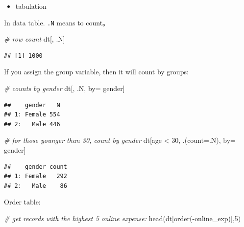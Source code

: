 \documentclass[
  12pt,
]{krantz}
\makeatletter
\newenvironment{Shaded}{\begin{snugshade}}{\end{snugshade}}
\newcommand{\AttributeTok}[1]{\textcolor[rgb]{0.61,0.61,0.61}{#1}}
\newcommand{\CommentTok}[1]{\textcolor[rgb]{0.37,0.37,0.37}{\textit{#1}}}
\newcommand{\DecValTok}[1]{\textcolor[rgb]{0.06,0.06,0.06}{#1}}
\newcommand{\FunctionTok}[1]{\textcolor[rgb]{0,0,0}{#1}}
\newcommand{\NormalTok}[1]{#1}
\newcommand{\OtherTok}[1]{\textcolor[rgb]{0.37,0.37,0.37}{#1}}
\newcommand{\SpecialCharTok}[1]{\textcolor[rgb]{0,0,0}{#1}}
\providecommand{\tightlist}{%
  \setlength{\itemsep}{0pt}\setlength{\parskip}{0pt}}
\newenvironment{kframe}{%
\medskip{}
\setlength{\fboxsep}{.8em}
 \def\at@end@of@kframe{}%
 \ifinner\ifhmode%
  \def\at@end@of@kframe{\end{minipage}}%
  \begin{minipage}{\columnwidth}%
 \fi\fi%
 \def\FrameCommand##1{\hskip\@totalleftmargin \hskip-\fboxsep
 \colorbox{shadecolor}{##1}\hskip-\fboxsep
     \hskip-\linewidth \hskip-\@totalleftmargin \hskip\columnwidth}%
 \MakeFramed {\advance\hsize-\width
   \@totalleftmargin\z@ \linewidth\hsize
   \@setminipage}}%
 {\par\unskip\endMakeFramed%
 \at@end@of@kframe}
\renewenvironment{Shaded}{\begin{kframe}}{\end{kframe}}
\makeatother
\begin{document}
\begin{itemize}
\tightlist
\item
  tabulation
\end{itemize}

In data table. \texttt{.N} means to count。

\begin{Shaded}
\begin{Highlighting}[]
\CommentTok{\# row count}
\NormalTok{dt[, .N] }
\end{Highlighting}
\end{Shaded}

\begin{verbatim}
## [1] 1000
\end{verbatim}

If you assign the group variable, then it will count by groups:

\begin{Shaded}
\begin{Highlighting}[]
\CommentTok{\# counts by gender}
\NormalTok{dt[, .N, by}\OtherTok{=}\NormalTok{ gender]  }
\end{Highlighting}
\end{Shaded}

\begin{verbatim}
##    gender   N
## 1: Female 554
## 2:   Male 446
\end{verbatim}

\begin{Shaded}
\begin{Highlighting}[]
\CommentTok{\# for those younger than 30, count by gender}
\NormalTok{ dt[age }\SpecialCharTok{\textless{}} \DecValTok{30}\NormalTok{, .(}\AttributeTok{count=}\NormalTok{.N), by}\OtherTok{=}\NormalTok{ gender] }
\end{Highlighting}
\end{Shaded}

\begin{verbatim}
##    gender count
## 1: Female   292
## 2:   Male    86
\end{verbatim}

Order table:

\begin{Shaded}
\begin{Highlighting}[]
\CommentTok{\# get records with the highest 5 online expense:}
\FunctionTok{head}\NormalTok{(dt[}\FunctionTok{order}\NormalTok{(}\SpecialCharTok{{-}}\NormalTok{online\_exp)],}\DecValTok{5}\NormalTok{) }
\end{Highlighting}
\end{Shaded}
\end{document}
